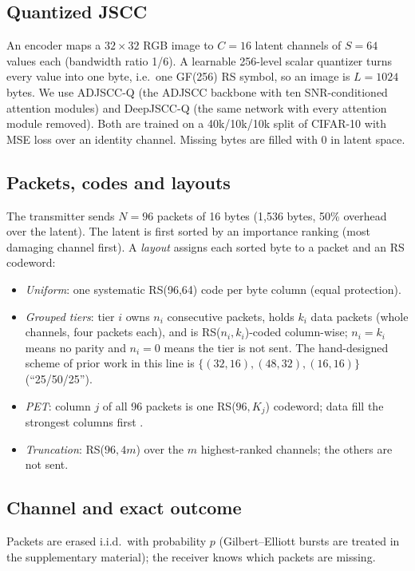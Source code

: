 \documentclass[conference]{IEEEtran}
\begin{document}
\subsection{Quantized JSCC}
An encoder maps a $32{\times}32$ RGB image to $C=16$ latent channels of $S=64$ values each
(bandwidth ratio 1/6). A learnable 256-level scalar quantizer turns every value into one byte, i.e.\ one
GF(256) RS symbol, so an image is $L=1024$ bytes. We use ADJSCC-Q (the ADJSCC backbone
\cite{xu2022adjscc} with ten SNR-conditioned attention modules) and DeepJSCC-Q (the same network with
every attention module removed). Both are trained on a 40k/10k/10k split of CIFAR-10
\cite{krizhevsky2009cifar} with MSE loss over an identity channel. Missing bytes are filled with $0$ in
latent space.

\subsection{Packets, codes and layouts}
The transmitter sends $N=96$ packets of 16 bytes (1,536 bytes, 50\% overhead over the latent). The
latent is first sorted by an importance ranking (most damaging channel first). A \emph{layout} assigns
each sorted byte to a packet and an RS codeword:
\begin{itemize}
\item \emph{Uniform}: one systematic RS(96,64) code per byte column (equal protection).
\item \emph{Grouped tiers}: tier $i$ owns $n_i$ consecutive packets, holds $k_i$ data packets (whole
channels, four packets each), and is RS($n_i,k_i$)-coded column-wise; $n_i=k_i$ means no parity and
$n_i=0$ means the tier is not sent. The hand-designed scheme of prior work in this line is
$\{(32,16),(48,32),(16,16)\}$ (``25/50/25'').
\item \emph{PET}: column $j$ of all 96 packets is one RS($96,K_j$) codeword; data fill the strongest
columns first \cite{albanese1996pet}.
\item \emph{Truncation}: RS($96,4m$) over the $m$ highest-ranked channels; the others are not sent.
\end{itemize}

\subsection{Channel and exact outcome}
Packets are erased i.i.d.\ with probability $p$ (Gilbert--Elliott bursts \cite{gilbert1960capacity,
elliott1963estimates} are treated in the supplementary material); the receiver knows which packets are
missing.
\end{document}
